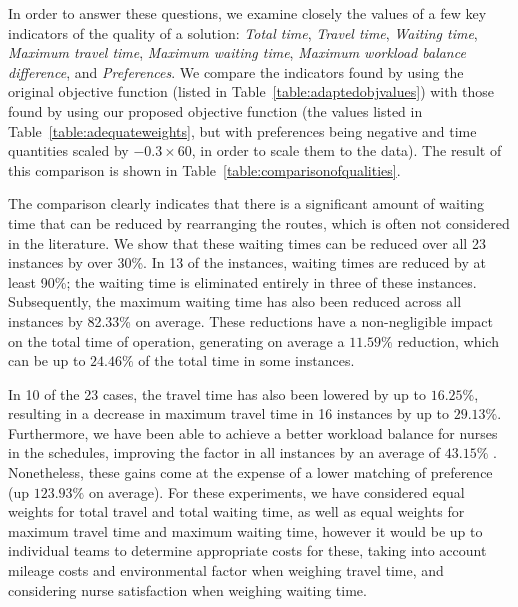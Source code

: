 \documentclass[a4paper,11pt,authoryear]{elsarticle}
\begin{document}
In order to answer these questions, we examine closely the values of a few key indicators of the quality of a solution: \emph{Total time}, \emph{Travel time}, \emph{Waiting time}, \emph{Maximum travel time}, \emph{Maximum waiting time}, \emph{Maximum workload balance difference}, and \emph{Preferences}. We compare the indicators found by using the original objective function (listed in Table~\ref{table:adaptedobjvalues}) with those found by using our proposed objective function (the values listed in Table~\ref{table:adequateweights}, but with preferences being negative and time quantities scaled by $-0.3\times60$, in order to scale them to the data). The result of this comparison is shown in Table~\ref{table:comparisonofqualities}.



\noindent The comparison clearly indicates that there is a significant amount of waiting time that can be reduced by rearranging the routes, which is often not considered in the literature. We show that these waiting times can be reduced over all 23 instances by over 30\%. In 13 of the instances, waiting times are reduced by at least 90\%; the waiting time is eliminated entirely in three of these instances. Subsequently, the maximum waiting time has also been reduced across all instances by 82.33\% on average. These reductions have a non-negligible impact on the total time of operation, generating on average a $11.59\%$ reduction, which can be up to $24.46\%$ of the total time in some instances.

In 10 of the 23 cases, the travel time has also been lowered by up to $16.25\%$, resulting in a decrease in maximum travel time in 16 instances by up to $29.13\%$. Furthermore, we have been able to achieve a better workload balance for nurses in the schedules, improving the factor in all instances by an average of $43.15\%$ . Nonetheless, these gains come at the expense of a lower matching of preference (up $123.93\%$ on average). For these experiments, we have considered equal weights for total travel and total waiting time, as well as equal weights for maximum travel time and maximum waiting time, however it would be up to individual teams to determine appropriate costs for these, taking into account mileage costs and environmental factor when weighing travel time, and considering nurse satisfaction when weighing waiting time.
\end{document}
